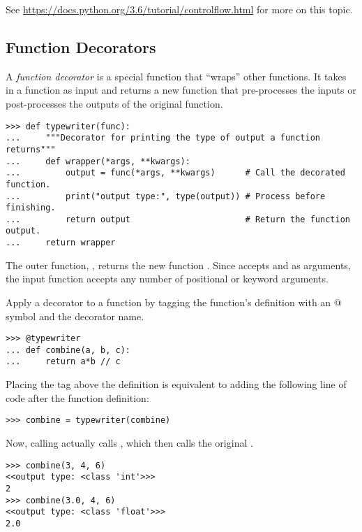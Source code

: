 See \url{https://docs.python.org/3.6/tutorial/controlflow.html} for more on this topic.

\subsection*{Function Decorators} %

A \emph{function decorator} is a special function that ``wraps'' other functions.
It takes in a function as input and returns a new function that pre-processes the inputs or post-processes the outputs of the original function.

\begin{lstlisting}
>>> def typewriter(func):
...     """Decorator for printing the type of output a function returns"""
...     def wrapper(*args, **kwargs):
...         output = func(*args, **kwargs)      # Call the decorated function.
...         print("output type:", type(output)) # Process before finishing.
...         return output                       # Return the function output.
...     return wrapper
\end{lstlisting}

The outer function, , returns the new function .
Since  accepts  and  as arguments, the input function  accepts any number of positional or keyword arguments.

Apply a decorator to a function by tagging the function's definition with an @ symbol and the decorator name.

\begin{lstlisting}
>>> @typewriter
... def combine(a, b, c):
...     return a*b // c
\end{lstlisting}

Placing the tag above the definition is equivalent to adding the following line of code after the function definition:

\begin{lstlisting}
>>> combine = typewriter(combine)
\end{lstlisting}

Now, calling  actually calls , which then calls the original .

\begin{lstlisting}
>>> combine(3, 4, 6)
<<output type: <class 'int'>>>
2
>>> combine(3.0, 4, 6)
<<output type: <class 'float'>>>
2.0
\end{lstlisting}

